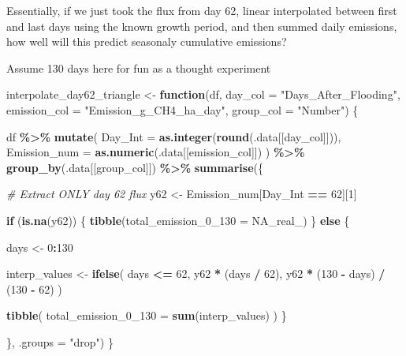 \documentclass[
]{article}
\newenvironment{Shaded}{\begin{snugshade}}{\end{snugshade}}
\newcommand{\AttributeTok}[1]{\textcolor[rgb]{0.13,0.29,0.53}{#1}}
\newcommand{\CommentTok}[1]{\textcolor[rgb]{0.56,0.35,0.01}{\textit{#1}}}
\newcommand{\ConstantTok}[1]{\textcolor[rgb]{0.56,0.35,0.01}{#1}}
\newcommand{\ControlFlowTok}[1]{\textcolor[rgb]{0.13,0.29,0.53}{\textbf{#1}}}
\newcommand{\DecValTok}[1]{\textcolor[rgb]{0.00,0.00,0.81}{#1}}
\newcommand{\FunctionTok}[1]{\textcolor[rgb]{0.13,0.29,0.53}{\textbf{#1}}}
\newcommand{\NormalTok}[1]{#1}
\newcommand{\OtherTok}[1]{\textcolor[rgb]{0.56,0.35,0.01}{#1}}
\newcommand{\SpecialCharTok}[1]{\textcolor[rgb]{0.81,0.36,0.00}{\textbf{#1}}}
\newcommand{\StringTok}[1]{\textcolor[rgb]{0.31,0.60,0.02}{#1}}
\begin{document}
Essentially, if we just took the flux from day 62, linear interpolated
between first and last days using the known growth period, and then
summed daily emissions, how well will this predict seasonaly cumulative
emissions?

Assume 130 days here for fun as a thought experiment

\begin{Shaded}
\begin{Highlighting}[]
\NormalTok{interpolate\_day62\_triangle }\OtherTok{\textless{}{-}} \ControlFlowTok{function}\NormalTok{(df,}
                                       \AttributeTok{day\_col =} \StringTok{"Days\_After\_Flooding"}\NormalTok{,}
                                       \AttributeTok{emission\_col =} \StringTok{"Emission\_g\_CH4\_ha\_day"}\NormalTok{,}
                                       \AttributeTok{group\_col =} \StringTok{"Number"}\NormalTok{) \{}
  
\NormalTok{  df }\SpecialCharTok{\%\textgreater{}\%}
    \FunctionTok{mutate}\NormalTok{(}
      \AttributeTok{Day\_Int =} \FunctionTok{as.integer}\NormalTok{(}\FunctionTok{round}\NormalTok{(.data[[day\_col]])),}
      \AttributeTok{Emission\_num =} \FunctionTok{as.numeric}\NormalTok{(.data[[emission\_col]])}
\NormalTok{    ) }\SpecialCharTok{\%\textgreater{}\%}
    \FunctionTok{group\_by}\NormalTok{(.data[[group\_col]]) }\SpecialCharTok{\%\textgreater{}\%}
    \FunctionTok{summarise}\NormalTok{(\{}
      
      \CommentTok{\# Extract ONLY day 62 flux}
\NormalTok{      y62 }\OtherTok{\textless{}{-}}\NormalTok{ Emission\_num[Day\_Int }\SpecialCharTok{==} \DecValTok{62}\NormalTok{][}\DecValTok{1}\NormalTok{]}
      
      \ControlFlowTok{if}\NormalTok{ (}\FunctionTok{is.na}\NormalTok{(y62)) \{}
        \FunctionTok{tibble}\NormalTok{(}\AttributeTok{total\_emission\_0\_130 =} \ConstantTok{NA\_real\_}\NormalTok{)}
\NormalTok{      \} }\ControlFlowTok{else}\NormalTok{ \{}
        
\NormalTok{        days }\OtherTok{\textless{}{-}} \DecValTok{0}\SpecialCharTok{:}\DecValTok{130}
        
\NormalTok{        interp\_values }\OtherTok{\textless{}{-}} \FunctionTok{ifelse}\NormalTok{(}
\NormalTok{          days }\SpecialCharTok{\textless{}=} \DecValTok{62}\NormalTok{,}
\NormalTok{          y62 }\SpecialCharTok{*}\NormalTok{ (days }\SpecialCharTok{/} \DecValTok{62}\NormalTok{),}
\NormalTok{          y62 }\SpecialCharTok{*}\NormalTok{ (}\DecValTok{130} \SpecialCharTok{{-}}\NormalTok{ days) }\SpecialCharTok{/}\NormalTok{ (}\DecValTok{130} \SpecialCharTok{{-}} \DecValTok{62}\NormalTok{)}
\NormalTok{        )}
        
        \FunctionTok{tibble}\NormalTok{(}
          \AttributeTok{total\_emission\_0\_130 =} \FunctionTok{sum}\NormalTok{(interp\_values)}
\NormalTok{        )}
\NormalTok{      \}}
      
\NormalTok{    \}, }\AttributeTok{.groups =} \StringTok{"drop"}\NormalTok{)}
\NormalTok{\}}
\end{Highlighting}
\end{Shaded}
\end{document}
